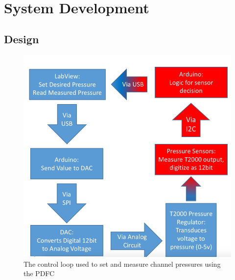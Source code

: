 \chapter{System Development}

\section{ Design}

\begin{figure}[h]
\centering 
\includegraphics[width=01.0\columnwidth]{PDFCsystemFlowchart.PNG} 
\caption[Communications flowchart for operation of the PDFC]{The control loop used to set and measure channel pressures using the PDFC} 
\label{fig:pneumaticSchematic} 
\end{figure}

